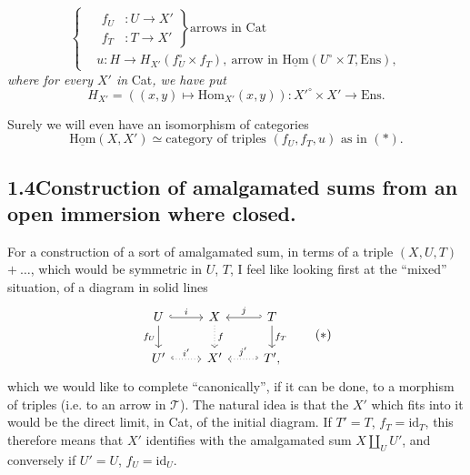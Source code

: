 \documentclass[11pt]{article}
\newcommand{\printedpage}[1]{\marginpar{\footnotesize p.~#1}}
\newcommand{\msp}[1]{\marginpar{\footnotesize [#1]}}
\newcommand{\Hom}{\mathrm{Hom}}
\newcommand{\uHom}{\underline{\mathrm{Hom}}}
\newcommand{\Ens}{\mathrm{Ens}}
\newcommand{\id}{\mathrm{id}}
\begin{document}
\printedpage{48}

\[
\left\{
\begin{aligned}
&\left.\begin{aligned} f_U &: U \longrightarrow X' \\ f_T &: T \longrightarrow X' \end{aligned}\right\}\text{arrows in Cat}\\
&u : H \longrightarrow H_{X'}(f_U^{\circ}\times f_T),\ \text{arrow in } \uHom(U^{\circ}\times T,\Ens),
\end{aligned}
\right.
\tag*{}
\]
\textit{where for every $X'$ in} Cat\textit{, we have put}
\[
H_{X'} = ((x,y)\longmapsto \Hom_{X'}(x,y)) : X'^{\circ}\times X' \longrightarrow \Ens.
\]

Surely we will even have an isomorphism of categories
\[
\uHom(X,X') \simeq \text{category of triples } (f_U,f_T,u) \text{ as in } (*).
\]

\subsection*{1.4\quad Construction of amalgamated sums from an open immersion where closed.} %

For a construction of a sort of amalgamated sum, in terms of a triple $(X,U,T)$ $+\ \ldots$, \msp{page 67} which would be symmetric in $U$, $T$, I feel like looking first at the ``mixed'' situation, of a diagram in solid lines
\[
\begin{tikzcd}
U \arrow[r, hook, "i"] \arrow[d, "f_U"'] & X \arrow[d, dotted, "f"] & T \arrow[l, hook', "j"'] \arrow[d, "f_T"] \\
U' \arrow[r, hook, dotted, "i'"] & X' & T', \arrow[l, hook', dotted, "j'"']
\end{tikzcd}
\tag*{$(*)$}
\]
which we would like to complete ``canonically'', if it can be done, to a morphism of triples (i.e. to an arrow in $\mathcal{T}$). The natural idea is that the $X'$ which fits into it would be the direct limit, in Cat, of the initial diagram. If $T'=T$, $f_T=\id_T$, this therefore means that $X'$ identifies with the amalgamated sum $X\amalg_U U'$, and conversely if $U'=U$, $f_U=\id_U$.
\end{document}

